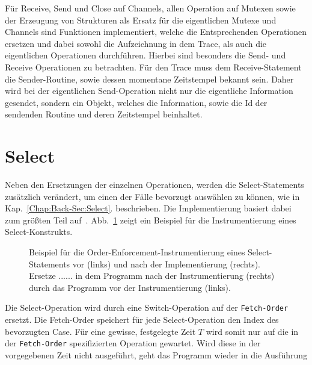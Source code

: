 Für Receive, Send und Close auf Channels,  allen Operation auf Mutexen sowie 
der Erzeugung von Strukturen als Ersatz für die eigentlichen Mutexe und Channels 
sind Funktionen implementiert, welche die Entsprechenden Operationen 
ersetzen und dabei sowohl die Aufzeichnung in dem Trace, als auch die eigentlichen
Operationen durchführen. Hierbei sind besonders die Send- und Receive Operationen 
zu betrachten. Für den Trace muss dem Receive-Statement die Sender-Routine, sowie 
dessen momentane 
Zeitstempel bekannt sein. Daher wird bei der eigentlichen
Send-Operation nicht nur die eigentliche Information gesendet, sondern ein  
Objekt, welches die Information, sowie die Id der sendenden Routine und deren
Zeitstempel beinhaltet.

\section{Select}\label{Chap:Inst-Sec:Select}
Neben den Ersetzungen der einzelnen Operationen, werden die Select-Statements zusätzlich
verändert, um einen der Fälle bevorzugt auswählen zu können, wie in Kap.~\ref{Chap:Back-Sec:Select}.
beschrieben. Die Implementierung basiert dabei zum größten Teil auf~\cite{gfuzz}.
Abb.~\ref{Chap:Analyze-Sec:Channel-SubSec:Select-Fig:GFuzz_Inst} zeigt ein 
Beispiel für die Instrumentierung eines Select-Konstrukts.
\begin{figure}[h!]
  \begin{minipage}[t]{0.3\textwidth}
    
  \end{minipage}
  \begin{minipage}[t]{0.65\textwidth}
    
  \end{minipage}
  \caption{Beispiel für die Order-Enforcement-Instrumentierung eines Select-Statements 
  vor (links) und nach der Implementierung (rechts). Ersetze $......$
  in dem Programm nach der Instrumentierung (rechts) durch das Programm vor der 
  Instrumentierung (links).~\cite[gekürzt]{gfuzz}}
  \label{Chap:Analyze-Sec:Channel-SubSec:Select-Fig:GFuzz_Inst}
\end{figure}
Die Select-Operation wird durch eine Switch-Operation auf der \texttt{Fetch-Order}
ersetzt. Die Fetch-Order speichert für jede Select-Operation den Index des bevorzugten
Case. Für eine gewisse, festgelegte Zeit $T$ wird somit nur auf die in der 
\texttt{Fetch-Order} spezifizierten Operation gewartet. Wird diese in der 
vorgegebenen Zeit nicht ausgeführt, geht das Programm wieder in die Ausführung
